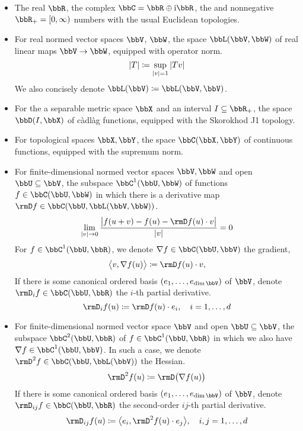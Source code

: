 \begin{itemize}
  \item
    The real $\bbR$, the complex $\bbC = \bbR \oplus \im\bbR$, the and nonnegative $\bbR_+ = [0,\infty)$ numbers with the usual Euclidean topologies.
  \item
    For real normed vector spaces $\vecSpace$, $\bbW$, the space $\bbL(\vecSpace,\bbW)$ of real linear maps $\vecSpace \rightarrow \bbW$, equipped with operator norm.
    \begin{equation*}
      |T| \coloneqq \sup_{|v|=1} |Tv|
    \end{equation*}
    We also concisely denote $\bbL(\vecSpace) \defeq \bbL(\vecSpace, \vecSpace)$.
  \item
    For the a separable metric space $\stateSpace$ and an interval $I \subseteq \bbR_+$, the space $\pathSpace{I}{\stateSpace}$ of c\`adl\`ag functions, equipped with the Skorokhod J1 topology.
  \item
    For topological spaces $\stateSpace, \bbY$, the space $\cpathSpace{\stateSpace}{\bbY}$ of continuous functions, equipped with the supremum norm.
  \item
    For finite-dimensional normed vector spaces $\vecSpace, \bbW$ and open $\bbU \subseteq \vecSpace$, the subspace $\ccpathSpace{1}{\bbU}{\bbW}$ of functions $f \in \cpathSpace{\bbU}{\bbW}$ in which there is a derivative map $\Der f \in \cpathSpace{\bbU}{\bbL(\vecSpace,\bbW)}$.
    \[
      \lim_{|\vecVar|\rightarrow0} \frac{\big| f(\momentVar + \vecVar) - f(\momentVar) - \Der f(\momentVar) \cdot \vecVar\big|}{|\vecVar|} = 0
    \]
    For $f \in \ccpathSpace{1}{\bbU}{\bbR}$, we denote $\nabla f \in \cpathSpace{\bbU}{\vecSpace}$ the gradient,
    \[
      \bprj{\vecVar}{\nabla f(\momentVar)} \defeq \Der f(\momentVar) \cdot \vecVar,
    \]
    If there is some canonical ordered basis $(\basisVec_1, \ldots, \basisVec_{\operatorname{dim}\vecSpace})$ of $\vecSpace$, denote $\Der_i f \in \cpathSpace{\bbU}{\bbR}$ the $i$-th partial derivative.
    \[
      \Der_i f(\momentVar) \defeq \Der f(\momentVar) \cdot \basisVec_i, \quad i = 1,\ldots, d
    \]
  \item
    For finite-dimensional normed vector space $\vecSpace$ and open $\bbU \subseteq \vecSpace$, the subspace $\ccpathSpace{2}{\bbU}{\bbR}$ of $f \in \ccpathSpace{1}{\bbU}{\bbR}$ in which we also have $\nabla f \in \ccpathSpace{1}{\bbU}{\vecSpace}$.
    In such a case, we denote $\Hess f \in \cpathSpace{\bbU}{\bbL(\vecSpace)}$ the Hessian.
    \[
      \Hess f(\momentVar) \defeq \Der\big( \nabla f(u) \big)
    \]
    If there is some canonical ordered basis $(\basisVec_1, \ldots, \basisVec_{\operatorname{dim}\vecSpace})$ of $\vecSpace$, denote $\Der_{ij} f \in \cpathSpace{\bbU}{\bbR}$ the second-order $ij$-th partial derivative.
    \[
      \Der_{ij} f(\momentVar) \defeq \bprj{\basisVec_i}{\Hess f(\momentVar) \cdot \basisVec_j}, \quad i,j = 1, \ldots, d
    \]
\end{itemize}
